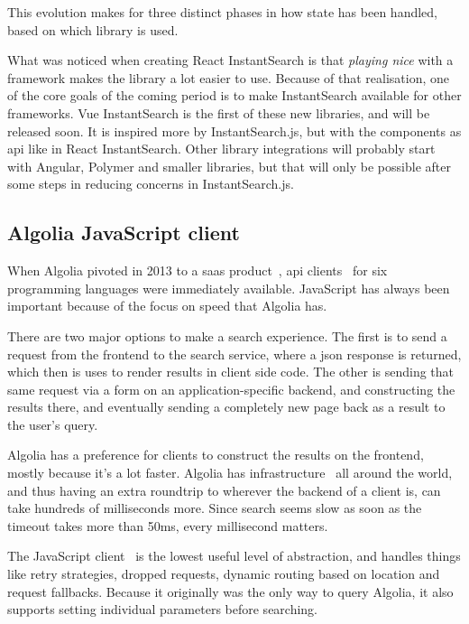 This evolution makes for three distinct phases in how state has been handled, based on which \gls{library} is used.

What was noticed when creating React InstantSearch is that \emph{playing nice} with a framework makes the library a lot easier to use. Because of that realisation, one of the core goals of the coming period is to make InstantSearch available for other frameworks. Vue InstantSearch is the first of these new libraries, and will be released soon. It is inspired more by InstantSearch.js, but with the components as \acrshort{api} like in React InstantSearch. Other library integrations will probably start with Angular, Polymer and smaller libraries, but that will only be possible after some steps in reducing concerns in InstantSearch.js.

\subsection{Algolia JavaScript client} %
\label{sub:algolia_js_client}

When Algolia pivoted in 2013 to a \acrshort{saas} product~\cite{algolia-blog-saas}, \acrshort{api} clients~\cite{algolia-blog-lauch} for six programming languages were immediately available. JavaScript has always been important because of the focus on speed that Algolia has.

There are two major options to make a search experience. The first is to send a request from the frontend to the search service, where a \acrshort{json} response is returned, which then is uses to render results in client side code. The other is sending that same request via a form on an application-specific backend, and constructing the results there, and eventually sending a completely new page back as a result to the user's query.

Algolia has a preference for clients to construct the results on the frontend, mostly because it's a lot faster. Algolia has infrastructure~\cite{algolia-infra} all around the world, and thus having an extra roundtrip to wherever the backend of a client is, can take hundreds of milliseconds more. Since search seems slow as soon as the timeout takes more than 50ms, every millisecond matters.

The JavaScript client~\cite{algolia-js-client} is the lowest useful level of abstraction, and handles things like retry strategies, dropped requests, dynamic routing based on location and request fallbacks. Because it originally was the only way to query Algolia, it also supports setting individual parameters before searching.

